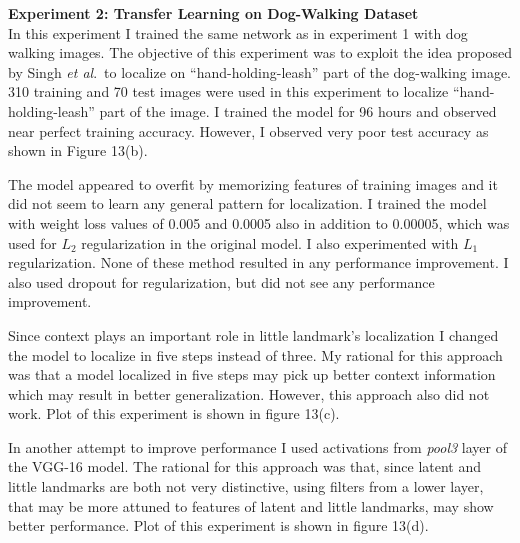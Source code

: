\documentclass [11pt,letterpaper ,twoside ,openany ]{report}
\begin{document}
    \noindent
    \textbf{Experiment 2: Transfer Learning on Dog-Walking Dataset}\\               
    In this experiment I trained the same network as in experiment 1 with dog walking images. The objective of this experiment was to exploit the idea proposed by Singh \textit{et al}.\ to localize on ``hand-holding-leash'' part of the dog-walking image. 310 training and 70 test images were used in this experiment to localize ``hand-holding-leash'' part of the image. I trained the model for 96 hours and observed near perfect training accuracy. However, I observed very poor test accuracy as shown in Figure 13(b).    

    The model appeared to overfit by memorizing features of training images and it did not seem to learn any general pattern for localization. I trained the model with weight loss values of 0.005 and 0.0005 also in addition to 0.00005, which was used for \(L_2\) regularization in the original model. I also experimented with \(L_1\) regularization. None of these method resulted in any performance improvement. I also used dropout \cite{srivastava2014dropout} for regularization, but did not see any performance improvement.

    Since context plays an important role in little landmark's localization I changed the model to localize in five steps instead of three. My rational for this approach was that a model localized in five steps may pick up better context information which may result in better generalization. However, this approach also did not work. Plot of this experiment is shown in figure 13(c).

    In another attempt to improve performance I used activations from \textit{pool3} layer of the VGG-16 model. The rational for this approach was that, since latent and little landmarks are both not very distinctive, using filters from a lower layer, that may be more attuned to features of latent and little landmarks, may show better performance. Plot of this experiment is shown in figure 13(d).\\
\end{document}
